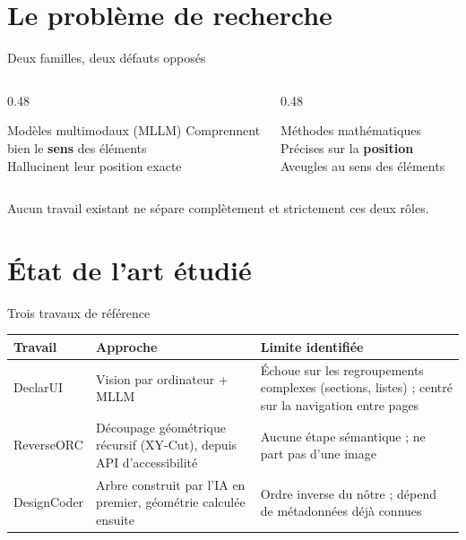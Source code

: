 \documentclass[11pt,aspectratio=169]{beamer}
\begin{document}
\section{Le problème de recherche}

\begin{frame}{Deux familles, deux défauts opposés}
  \begin{columns}[T,onlytextwidth]
    \begin{column}{0.48\textwidth}
      \begin{alertblock}{Modèles multimodaux (MLLM)}
        Comprennent bien le \textbf{sens} des éléments \\[2pt]
        \alert{Hallucinent leur position} exacte
      \end{alertblock}
    \end{column}
    \begin{column}{0.48\textwidth}
      \begin{block}{Méthodes mathématiques}
        Précises sur la \textbf{position} \\[2pt]
        \alert{Aveugles au sens} des éléments
      \end{block}
    \end{column}
  \end{columns}
  \vspace{8mm}
  \begin{center}
  \small Aucun travail existant ne sépare complètement et strictement ces deux rôles.
  \end{center}
\end{frame}

\section{État de l'art étudié}

\begin{frame}{Trois travaux de référence}
  \small
  \renewcommand{\arraystretch}{1.6}
  \begin{tabular}{@{}p{2.1cm}p{3.6cm}p{5.6cm}@{}}
    \toprule
    \textbf{Travail} & \textbf{Approche} & \textbf{Limite identifiée} \\
    \midrule
    DeclarUI & Vision par ordinateur + MLLM & Échoue sur les regroupements complexes (sections, listes) ; centré sur la navigation entre pages \\
    ReverseORC & Découpage géométrique récursif (XY-Cut), depuis API d'accessibilité & Aucune étape sémantique ; ne part pas d'une image \\
    DesignCoder & Arbre construit par l'IA en premier, géométrie calculée ensuite & Ordre inverse du nôtre ; dépend de métadonnées déjà connues \\
    \bottomrule
  \end{tabular}
\end{frame}
\end{document}
